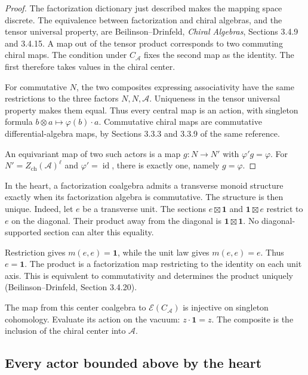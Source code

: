 \begin{proof}
The factorization
dictionary just
described makes
the mapping
space discrete.
The equivalence
between factorization
and chiral algebras,
and the tensor
universal property,
are Beilinson--Drinfeld,
\emph{Chiral Algebras},
Sections 3.4.9
and 3.4.15.
A map out of
the tensor product
corresponds to
two commuting
chiral maps.
The condition
under $C_{\mathcal A}$
fixes the second
map as the
identity.
The first
therefore takes
values in the
chiral center.

For commutative
$N$, the two
composites expressing
associativity have
the same restrictions
to the three
factors
$N,N,\mathcal A$.
Uniqueness in
the tensor
universal property
makes them equal.
Thus every
central map
is an action,
with singleton
formula
$b\otimes a\mapsto
\varphi(b)\cdot a$.
Commutative chiral
maps are
commutative
differential-algebra
maps, by
Sections 3.3.3
and 3.3.9 of
the same reference.

An equivariant
map of two
such actors
is a map
$g:N\to N'$
with
$\varphi'g=\varphi$.
For
$N'=Z_{\mathrm{ch}}(\mathcal A)^\ell$
and
$\varphi'=\operatorname{id}$,
there is exactly
one, namely
$g=\varphi$.
\end{proof}

In the heart,
a factorization
coalgebra admits
a transverse
monoid structure
exactly when
its factorization
algebra is
commutative.
The structure
is then unique.
Indeed, let
$e$ be a
transverse unit.
The sections
$e\boxtimes\mathbf1$
and
$\mathbf1\boxtimes e$
restrict to
$e$ on the
diagonal.
Their product
away from the
diagonal is
$\mathbf1\boxtimes\mathbf1$.
No diagonal-supported
section can
alter this
equality.

Restriction gives
$m(e,e)=\mathbf1$,
while the unit
law gives
$m(e,e)=e$.
Thus $e=\mathbf1$.
The product is a factorization map restricting to the identity
on each unit axis. This is equivalent to commutativity and
determines the product uniquely (Beilinson--Drinfeld,
Section 3.4.20).

The map from
this center
coalgebra to
$\mathcal E(C_{\mathcal A})$
is injective on
singleton cohomology.
Evaluate its
action on the
vacuum:
$z\cdot\mathbf1=z$.
The composite
is the inclusion
of the chiral
center into
$\mathcal A$.

\subsection{Every actor bounded above by the heart}
\label{v4-arith:centers:subsec:below-heart}

